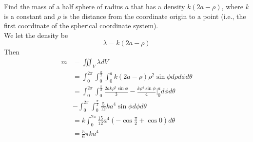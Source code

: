 \documentclass[12pt]{article}
\begin{document}
\begin{ex}
	Find the mass of a half sphere of radius $a$ that has a density $k(2a-\rho)$, where $k$ is a constant and $\rho$ is the distance from the coordinate origin to a point (i.e., the first coordinate of the spherical coordinate system). \\
	We let the density be
	$$\lambda = k(2a-\rho)$$
	Then
	\begin{align*}
		m &= \iiint_V \lambda dV \\
		  &= \int_0^{2\pi} \int_0^{\frac{\pi}{2}} \int_0^a k(2a-\rho)\rho^2\sin\phi d\rho d\phi d\theta \\
		  &= \int_0^{2\pi} \int_0^{\frac{\pi}{2}} \frac{2ak\rho^3\sin\phi}{3} - \frac{k\rho^4\sin\phi}{4} \Big |_0^a d\phi d\theta \\
		  &- \int_0^{2\pi} \int_0^{\frac{\pi}{2}} \frac{5}{12}ka^4\sin\phi d\phi d\theta \\
		  &= k\int_0^{2\pi} \frac{15}{12} a^4\left(-\cos\frac{\pi}{2} + \cos 0 \right)d\theta \\
		  &= \frac{5}{6}\pi ka^4 \\
	\end{align*}
\end{ex}
\end{document}
